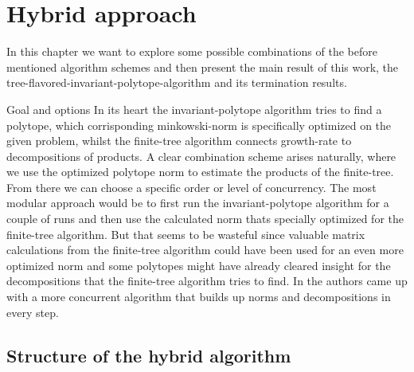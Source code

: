 
\chapter{Hybrid approach} 
\label{ch:hybrid}

In this chapter we want to explore some possible combinations of the before mentioned algorithm schemes and then present the main result of this work, the tree-flavored-invariant-polytope-algorithm and its termination results. 

\begin{section}{Goal and options}
In its heart the invariant-polytope algorithm tries to find a polytope, which corrisponding minkowski-norm is specifically optimized on the given problem, whilst the finite-tree algorithm connects growth-rate to decompositions of products. A clear combination scheme arises naturally, where we use the optimized polytope norm to estimate the products of the finite-tree. From there we can choose a specific order or level of concurrency.
\newline
The most modular approach would be to first run the invariant-polytope algorithm for a couple of runs and then use the calculated norm thats specially optimized for the finite-tree algorithm. But that seems to be wasteful since valuable matrix calculations from the finite-tree algorithm could have been used for an even more optimized norm and some polytopes might have already cleared insight for the decompositions that the finite-tree algorithm tries to find. In \citep{mejstrikHybridApproachJoint} the authors came up with a more concurrent algorithm that builds up norms and decompositions in every step. 
\end{section}

\section{Structure of the hybrid algorithm}

